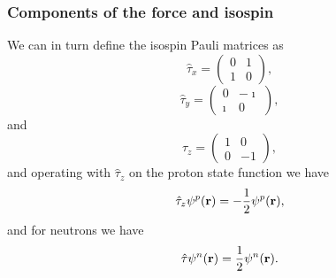 \documentclass[compress]{beamer}
\begin{document}
\frame
{
\frametitle{Components of the force and isospin}
\begin{small}
{\scriptsize
We can in turn define the isospin Pauli matrices as
\[
\hat{\tau}_x =\left(\begin{array}{cc} 0 & 1 \\ 1 & 0 \end{array}\right),
\]
\[
\hat{\tau}_y =\left(\begin{array}{cc} 0 & -\imath \\ \imath & 0 \end{array}\right),
\]
and
\[
\hat{\tau}_z =\left(\begin{array}{cc} 1 & 0 \\ 0 & -1 \end{array}\right),
\]
and operating with $\hat{\tau}_z$ on the proton state function we have
\[
\hat{\tau}_z\psi^p({\bf r})=-\frac{1}{2}\psi^p({\bf r}),
\]
and for neutrons we have
\[
\hat{\tau}\psi^n({\bf r})=\frac{1}{2}\psi^n({\bf r}).
\]
}
\end{small}
}
\end{document}
